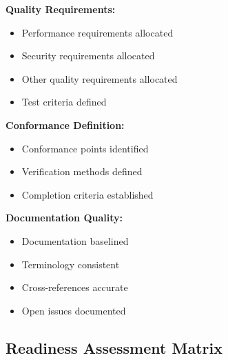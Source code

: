 \documentclass[11pt]{article}
\begin{document}
\begin{checklistbox}
\textbf{Quality Requirements:}
\begin{itemize}[leftmargin=1.5cm]
    \item[$\square$] Performance requirements allocated
    \item[$\square$] Security requirements allocated
    \item[$\square$] Other quality requirements allocated
    \item[$\square$] Test criteria defined
\end{itemize}

\textbf{Conformance Definition:}
\begin{itemize}[leftmargin=1.5cm]
    \item[$\square$] Conformance points identified
    \item[$\square$] Verification methods defined
    \item[$\square$] Completion criteria established
\end{itemize}

\textbf{Documentation Quality:}
\begin{itemize}[leftmargin=1.5cm]
    \item[$\square$] Documentation baselined
    \item[$\square$] Terminology consistent
    \item[$\square$] Cross-references accurate
    \item[$\square$] Open issues documented
\end{itemize}
\end{checklistbox}

\subsection{Readiness Assessment Matrix}
\end{document}
